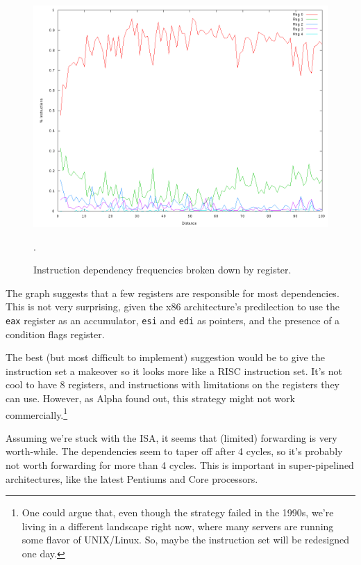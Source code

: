 \begin{figure}[htb]
  \includegraphics[width=6.8in]{6.823/lab1/figs/reg_frequencies.png}
  \caption{Instruction dependency frequencies broken down by register. }
  \label{q2:reg_frequencies}.
\end{figure}

The graph suggests that a few registers are responsible for most dependencies.
This is not very surprising, given the x86 architecture's predilection to use
the \texttt{eax} register as an accumulator, \texttt{esi} and \texttt{edi}
as pointers, and the presence of a condition flags register.

The best (but most difficult to implement) suggestion would be to give the
instruction set a makeover so it looks more like a RISC instruction set. It's
not cool to have 8 registers, and instructions with limitations on the registers
they can use. However, as Alpha found out, this strategy might not work
commercially.\footnote{One could argue that, even though the strategy failed in
the 1990s, we're living in a different landscape right now, where many servers
are running some flavor of UNIX/Linux. So, maybe the instruction set will be
redesigned one day.}

Assuming we're stuck with the ISA, it seems that (limited) forwarding is very
worth-while. The dependencies seem to taper off after 4 cycles, so it's
probably not worth forwarding for more than 4 cycles. This is important in
super-pipelined architectures, like the latest Pentiums and Core processors.
